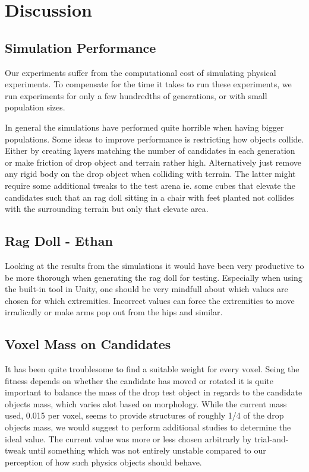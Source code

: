 \section{Discussion}
\subsection{Simulation Performance}
Our experiments suffer from the computational cost of simulating physical
experiments. To compensate for the time it takes to run these experiments, we
run experiments for only a few hundredths of generations, or with small
population sizes. 

In general the
simulations have performed quite horrible when having bigger populations. Some
ideas to improve performance is restricting how objects collide. Either by
creating layers matching the number of candidates in each generation or make
friction of drop object and terrain rather high. Alternatively just remove any
rigid body on the drop object when colliding with terrain. The latter might
require some additional tweaks to the test arena ie. some cubes that elevate
the candidates such that an rag doll sitting in a chair with feet planted not
collides with the surrounding terrain but only that elevate area.

\subsection{Rag Doll - Ethan}
Looking at the results from the simulations it would have been very productive to be more
thorough when generating the rag doll for testing.
Especially when using the built-in tool in Unity, one should be very mindfull about which values are chosen for which extremities.
Incorrect values can force the extremities to move irradically or make arms pop out from the hips and similar.

\subsection{Voxel Mass on Candidates} It has been quite troublesome to find a
suitable weight for every voxel. Seing the fitness depends on whether the
candidate has moved or rotated it is quite important to balance the mass of the
drop test object in regards to the candidate objects mass, which varies alot
based on morphology. While the current mass used, 0.015 per voxel, seems to
provide structures of roughly 1/4 of the drop objects mass, we would suggest to
perform additional studies to determine the ideal value. The current value was
more or less chosen arbitrarly by trial-and-tweak until something which was not
entirely unstable compared to our perception of how such physics objects should
behave.
